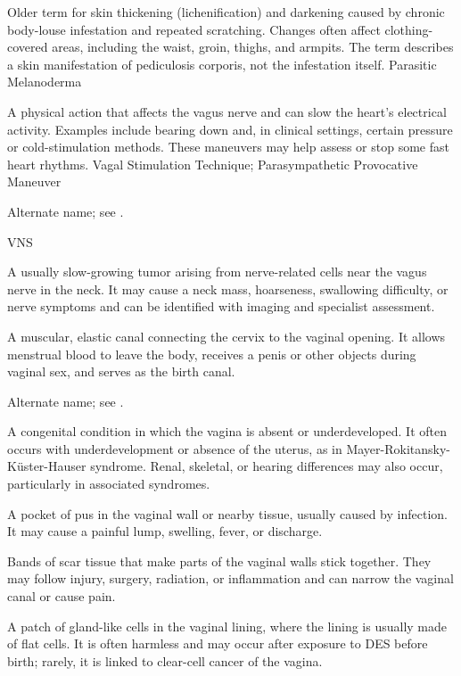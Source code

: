  Older term for skin thickening (lichenification) and darkening
caused by chronic body-louse infestation and repeated scratching. Changes often affect
clothing-covered areas, including the waist, groin, thighs, and armpits. The term describes
a skin manifestation of pediculosis corporis, not the infestation itself.
\synonyms
Parasitic Melanoderma

 A physical action that affects the vagus nerve and can slow the heart’s electrical activity. Examples include bearing down and, in clinical settings, certain pressure or cold-stimulation methods. These maneuvers may help assess or stop some fast heart rhythms.
\synonyms
Vagal Stimulation Technique; Parasympathetic Provocative Maneuver

 Alternate name; see .

\synonyms
VNS

 A usually slow-growing tumor arising from nerve-related cells near the vagus nerve in the neck. It may cause a neck mass, hoarseness, swallowing difficulty, or nerve symptoms and can be identified with imaging and specialist assessment.

 A muscular, elastic canal connecting the cervix to the vaginal opening. It allows menstrual blood to leave the body, receives a penis or other objects during vaginal sex, and serves as the birth canal.

 Alternate name; see .

 A congenital condition in which the vagina is absent or
underdeveloped. It often occurs with underdevelopment or absence of the uterus, as in
Mayer-Rokitansky-Küster-Hauser syndrome. Renal, skeletal, or hearing differences may also
occur, particularly in associated syndromes.

 A pocket of pus in the vaginal wall or nearby tissue, usually caused by infection. It may cause a painful lump, swelling, fever, or discharge.

 Bands of scar tissue that make parts of the vaginal walls stick together. They may follow injury, surgery, radiation, or inflammation and can narrow the vaginal canal or cause pain.

 A patch of gland-like cells in the vaginal lining, where the lining is usually made of flat cells. It is often harmless and may occur after exposure to DES before birth; rarely, it is linked to clear-cell cancer of the vagina.

